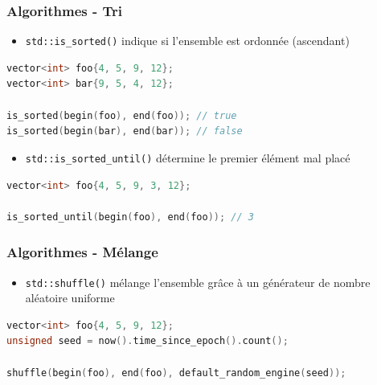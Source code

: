 \documentclass[C++.tex]{subfiles}
\begin{document}
\begin{frame}[fragile]
	\frametitle{Algorithmes - Tri}
	\begin{itemize}
		\item \lstinline|std::is_sorted()| indique si l'ensemble est ordonnée (ascendant)
	\end{itemize}


	\begin{lstlisting}[language=C++]
vector<int> foo{4, 5, 9, 12};
vector<int> bar{9, 5, 4, 12};

is_sorted(begin(foo), end(foo)); // true
is_sorted(begin(bar), end(bar)); // false\end{lstlisting}

	\begin{itemize}
		\item \lstinline|std::is_sorted_until()| détermine le premier élément mal placé
	\end{itemize}

	\begin{lstlisting}[language=C++]
vector<int> foo{4, 5, 9, 3, 12};

is_sorted_until(begin(foo), end(foo)); // 3\end{lstlisting}
\end{frame}

\begin{frame}[fragile]
	\frametitle{Algorithmes - Mélange}
	\begin{itemize}
		\item \lstinline|std::shuffle()| mélange l'ensemble grâce à un générateur de nombre aléatoire \og uniforme\fg{}
	\end{itemize}

	\begin{lstlisting}[language=C++]
vector<int> foo{4, 5, 9, 12};
unsigned seed = now().time_since_epoch().count();

shuffle(begin(foo), end(foo), default_random_engine(seed));\end{lstlisting}

\end{frame}
\end{document}
